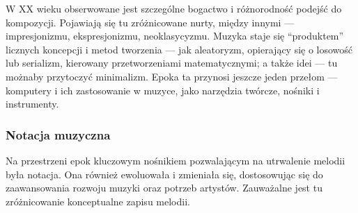 \documentclass[12pt]{article}
\begin{document}
\begin{itemize}
	      W XX wieku obserwowane jest szczególne bogactwo i różnorodność podejść do kompozycji.
	      Pojawiają się tu zróżnicowane nurty, między innymi — impresjonizmu, ekspresjonizmu, neoklasycyzmu.
	      Muzyka staje się \enquote{produktem} licznych koncepcji i metod tworzenia — jak aleatoryzm, opierający
	      się o losowość lub serializm, kierowany przetworzeniami matematycznymi; a także idei — tu możnaby przytoczyć minimalizm.
	      Epoka ta przynosi jeszcze jeden przełom — komputery i ich zastosowanie w muzyce, jako narzędzia twórcze, nośniki i instrumenty.
\end{itemize}

\subsubsection{Notacja muzyczna}
Na przestrzeni epok kluczowym nośnikiem pozwalającym na utrwalenie melodii była notacja.
Ona również ewoluowała i zmieniała się, dostosowując się do zaawansowania rozwoju muzyki oraz potrzeb artystów.
Zauważalne jest tu zróżnicowanie konceptualne zapisu melodii.
\end{document}

